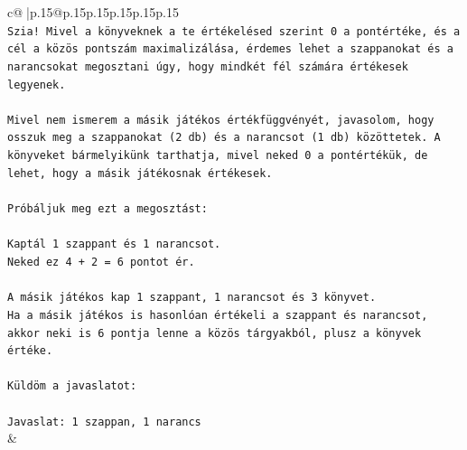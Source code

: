 \documentclass{article}
\begin{document}
{\begin{supertabular}{c@{$\;$}|p{.15\linewidth}@{}p{.15\linewidth}p{.15\linewidth}p{.15\linewidth}p{.15\linewidth}p{.15\linewidth}}
{{{\\ 
\texttt{Szia! Mivel a könyveknek a te értékelésed szerint 0 a pontértéke, és a cél a közös pontszám maximalizálása, érdemes lehet a szappanokat és a narancsokat megosztani úgy, hogy mindkét fél számára értékesek legyenek.} \\
\\ 
\texttt{Mivel nem ismerem a másik játékos értékfüggvényét, javasolom, hogy osszuk meg a szappanokat (2 db) és a narancsot (1 db) közöttetek. A könyveket bármelyikünk tarthatja, mivel neked 0 a pontértékük, de lehet, hogy a másik játékosnak értékesek.} \\
\\ 
\texttt{Próbáljuk meg ezt a megosztást:} \\
\\ 
\texttt{Kaptál 1 szappant és 1 narancsot.} \\
\texttt{Neked ez 4 + 2 = 6 pontot ér.} \\
\\ 
\texttt{A másik játékos kap 1 szappant, 1 narancsot és 3 könyvet.} \\
\texttt{Ha a másik játékos is hasonlóan értékeli a szappant és narancsot, akkor neki is 6 pontja lenne a közös tárgyakból, plusz a könyvek értéke.} \\
\\ 
\texttt{Küldöm a javaslatot:} \\
\\ 
\texttt{Javaslat: 1 szappan, 1 narancs} \\
            }
        }
    }
    & \\ \\


\end{supertabular}}
\end{document}
